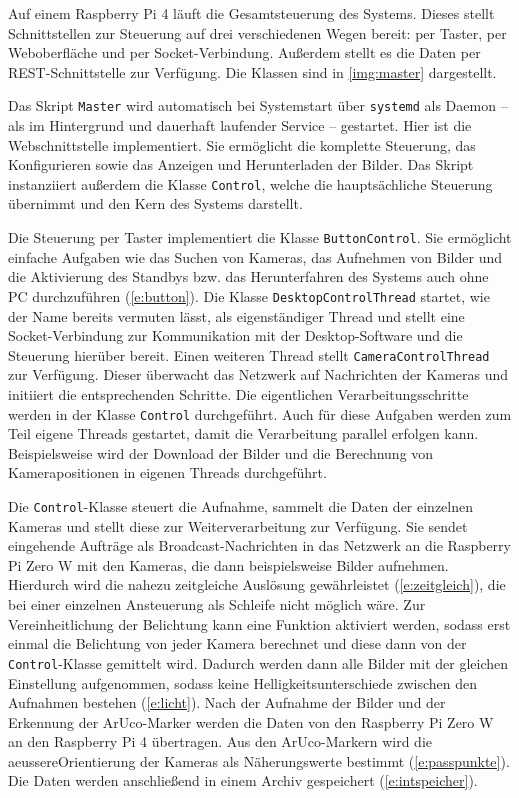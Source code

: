 \documentclass[./00PhotoBox.tex]{subfiles}
\begin{document}
Auf einem Raspberry Pi 4 läuft die Gesamt\-steuerung des Systems. Dieses stellt Schnitt\-stellen zur Steuerung auf drei verschiedenen Wegen bereit: per Taster, per Weboberfläche und per \Gls{Socket}-Verbindung. Außerdem stellt es die Daten per \Gls{REST}-Schnittstelle zur Verfügung. Die Klassen sind in \autoref{img:master} dargestellt.

Das Skript \texttt{Master} wird automatisch bei Systemstart über \texttt{systemd} als Daemon -- als im Hintergrund und dauerhaft laufender Service \citep[S. 369]{negus2020linux} -- gestartet. Hier ist die Webschnittstelle implementiert. Sie ermöglicht die komplette Steuerung, das Konfigurieren sowie das Anzeigen und Herunterladen der Bilder. Das Skript instanziiert außerdem die Klasse \texttt{Control}, welche die hauptsächliche Steuerung übernimmt und den Kern des Systems darstellt.

Die Steuerung per Taster implementiert die Klasse \texttt{ButtonControl}. Sie ermöglicht einfache Aufgaben wie das Suchen von Kameras, das Aufnehmen von Bilder und die Aktivierung des Standbys bzw. das Herunterfahren des Systems auch ohne PC durchzuführen (\autoref{e:button}). Die Klasse \texttt{DesktopControlThread} startet, wie der Name bereits vermuten lässt, als eigenständiger Thread und stellt eine \Gls{Socket}-Verbindung zur Kommunikation mit der Desktop-Software und die Steuerung hierüber bereit. Einen weiteren Thread stellt \texttt{CameraControlThread} zur Verfügung. Dieser überwacht das Netzwerk auf Nachrichten der Kameras und initiiert die entsprechenden Schritte. Die eigentlichen Verarbeitungsschritte werden in der Klasse \texttt{Control} durchgeführt. Auch für diese Aufgaben werden zum Teil eigene Threads gestartet, damit die Verarbeitung parallel erfolgen kann. Beispielsweise wird der Download der Bilder und die Berechnung von Kamerapositionen in eigenen Threads durchgeführt.

Die \texttt{Control}-Klasse steuert die Aufnahme, sammelt die Daten der einzelnen Kameras und stellt diese zur Weiterverarbeitung zur Verfügung. Sie sendet eingehende Aufträge als Broadcast-Nachrichten in das Netzwerk an die Raspberry Pi Zero W mit den Kameras, die dann beispielsweise Bilder aufnehmen. Hierdurch wird die nahezu zeitgleiche Auslösung gewährleistet (\autoref{e:zeitgleich}), die bei einer einzelnen Ansteuerung als Schleife nicht möglich wäre. Zur Vereinheitlichung der Belichtung kann eine Funktion aktiviert werden, sodass erst einmal die Belichtung von jeder Kamera berechnet und diese dann von der \texttt{Control}-Klasse gemittelt wird. Dadurch werden dann alle Bilder mit der gleichen Einstellung aufgenommen, sodass keine Helligkeitsunterschiede zwischen den Aufnahmen bestehen (\autoref{e:licht}).
Nach der Aufnahme der Bilder und der Erkennung der ArUco-Marker werden die Daten von den Raspberry Pi Zero W an den Raspberry Pi 4 übertragen. Aus den ArUco-Markern wird die \gls{aeussereOrientierung} der Kameras als Näherungswerte bestimmt (\autoref{e:passpunkte}). Die Daten werden anschließend in einem Archiv gespeichert (\autoref{e:intspeicher}).
\end{document}
